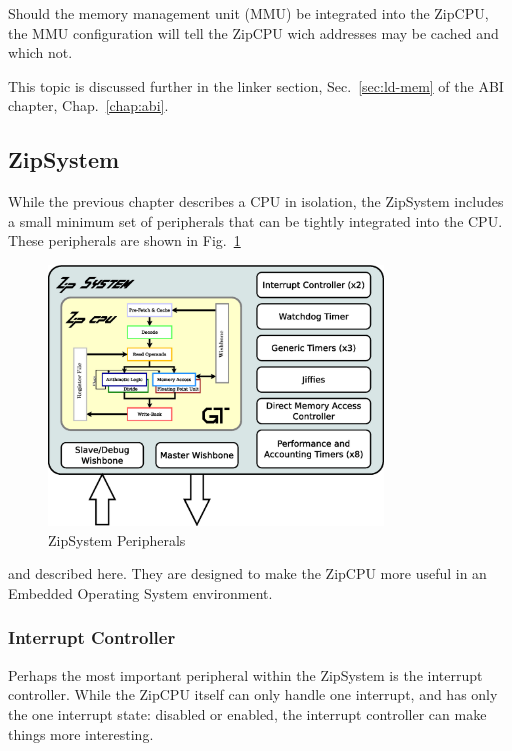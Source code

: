 \documentclass{gqtekspec}
\begin{document}
Should the memory management unit (MMU) be integrated into the ZipCPU, the MMU
configuration will tell the ZipCPU wich addresses may be cached and which not.

This topic is discussed further in the linker section, Sec.~\ref{sec:ld-mem}
of the ABI chapter, Chap.~\ref{chap:abi}.


\subsection{ZipSystem}\label{sec:zipsys}

While the previous chapter describes a CPU in isolation, the ZipSystem
includes a small minimum set of peripherals that can be tightly integrated into
the CPU.  These peripherals are shown in Fig.~\ref{fig:zipsystem}
\begin{figure}\begin{center}
\includegraphics[width=3.5in]{../gfx/system.eps}
\caption{ZipSystem Peripherals}\label{fig:zipsystem}
\end{center}\end{figure}
and described here.  They are designed to make
the ZipCPU more useful in an Embedded Operating System environment.

\subsubsection{Interrupt Controller}\label{sec:pic}

Perhaps the most important peripheral within the ZipSystem is the interrupt
controller.  While the ZipCPU itself can only handle one interrupt, and has
only the one interrupt state: disabled or enabled, the interrupt controller
can make things more interesting.
\end{document}
